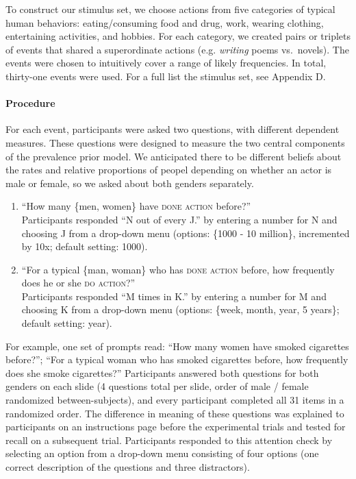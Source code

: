 \documentclass[english,floatsintext,man]{apa6}
\theoremstyle{definition}
\theoremstyle{definition}
\theoremstyle{definition}
\theoremstyle{remark}
\begin{document}
To construct our stimulus set, we choose actions from five categories of
typical human behaviors: eating/consuming food and drug, work, wearing
clothing, entertaining activities, and hobbies. For each category, we
created pairs or triplets of events that shared a superordinate actions
(e.g. \emph{writing} poems vs.~novels). The events were chosen to
intuitively cover a range of likely frequencies. In total, thirty-one
events were used. For a full list the stimulus set, see Appendix D.

\paragraph{Procedure}\label{procedure}

For each event, participants were asked two questions, with different
dependent measures. These questions were designed to measure the two
central components of the prevalence prior model. We anticipated there
to be different beliefs about the rates and relative proportions of
peopel depending on whether an actor is male or female, so we asked
about both genders separately.

\begin{enumerate}
\item ``How many \{men, women\} have \textsc{done action} before?'' \\

Participants responded ``N out of every J.'' by entering a number for N and choosing J from a drop-down menu (options: \{1000 - 10 million\}, incremented by 10x; default setting: 1000).

\item ``For a typical \{man, woman\} who has \textsc{done action}  before, how frequently does he or she \textsc{do action}?''\\  

Participants responded ``M times in K.'' by entering a number for M and choosing K from a drop-down menu (options: \{week, month, year, 5 years\}; default setting: year).
\end{enumerate}

For example, one set of prompts read: \enquote{How many women have
smoked cigarettes before?}; \enquote{For a typical woman who has smoked
cigarettes before, how frequently does she smoke cigarettes?}
Participants answered both questions for both genders on each slide (4
questions total per slide, order of male / female randomized
between-subjects), and every participant completed all 31 items in a
randomized order. The difference in meaning of these questions was
explained to participants on an instructions page before the
experimental trials and tested for recall on a subsequent trial.
Participants responded to this attention check by selecting an option
from a drop-down menu consisting of four options (one correct
description of the questions and three distractors).
\end{document}
